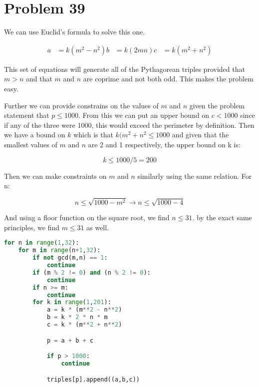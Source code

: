\documentclass{article}
\begin{document}
	
	\section*{Problem 39}
		
		We can use Euclid's formula to solve this one.
		
		\begin{align}
			a &= k(m^2-n^2)
			b &= k(2mn)
			c &= k(m^2+n^2)
		\end{align}
		
		This set of equations will generate all of the Pythagorean triples provided that \(m>n\) and that \(m\) and \(n\) are coprime and not both odd. This makes the problem easy.
		
		Further we can provide constrains on the values of $m$ and $n$ given the problem statement that \(p \le 1000\). From this we can put an upper bound on \(c < 1000\) since if any of the three were 1000, this would exceed the perimeter by definition. Then we have a bound on \(k\) which is that \(k(m^2+n^2\le 1000\) and given that the smallest values of $m$ and $n$ are 2 and 1 respectively, the upper bound on k is:
		
		\[k \le 1000/5 = 200\]
		
		Then we can make constraints on $m$ and $n$ similarly using the same relation. For n:
		
		\[n\le \sqrt{1000-m^2}\rightarrow n\le \sqrt{1000-4}\]
		
		And using a floor function on the square root, we find \(n \le 31\). by the exact same principles, we find \(m \le 31\) as well.
		
\begin{lstlisting}[language=Python]
for n in range(1,32):
	for m in range(n+1,32):
		if not gcd(m,n) == 1:
			continue
		if (m % 2 != 0) and (n % 2 != 0):
			continue
		if n >= m:
			continue
		for k in range(1,201):
			a = k * (m**2 - n**2)
			b = k * 2 * n * m
			c = k * (m**2 + n**2)

			p = a + b + c

			if p > 1000:
				continue 

			triples[p].append((a,b,c))
\end{lstlisting}
		
\end{document}
